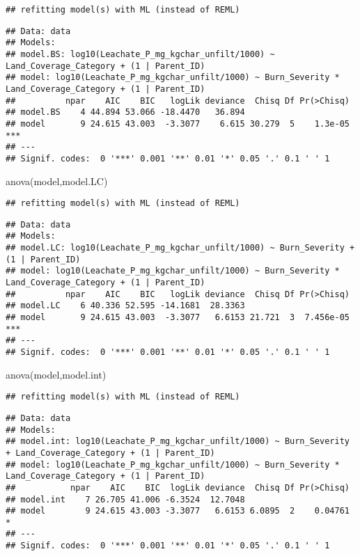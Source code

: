 \documentclass[
]{article}
\newenvironment{Shaded}{\begin{snugshade}}{\end{snugshade}}
\newcommand{\FunctionTok}[1]{\textcolor[rgb]{0.00,0.00,0.00}{#1}}
\newcommand{\NormalTok}[1]{#1}
\begin{document}
\begin{verbatim}
## refitting model(s) with ML (instead of REML)
\end{verbatim}

\begin{verbatim}
## Data: data
## Models:
## model.BS: log10(Leachate_P_mg_kgchar_unfilt/1000) ~ Land_Coverage_Category + (1 | Parent_ID)
## model: log10(Leachate_P_mg_kgchar_unfilt/1000) ~ Burn_Severity * Land_Coverage_Category + (1 | Parent_ID)
##          npar    AIC    BIC   logLik deviance  Chisq Df Pr(>Chisq)    
## model.BS    4 44.894 53.066 -18.4470   36.894                         
## model       9 24.615 43.003  -3.3077    6.615 30.279  5    1.3e-05 ***
## ---
## Signif. codes:  0 '***' 0.001 '**' 0.01 '*' 0.05 '.' 0.1 ' ' 1
\end{verbatim}

\begin{Shaded}
\begin{Highlighting}[]
\FunctionTok{anova}\NormalTok{(model,model.LC)}
\end{Highlighting}
\end{Shaded}

\begin{verbatim}
## refitting model(s) with ML (instead of REML)
\end{verbatim}

\begin{verbatim}
## Data: data
## Models:
## model.LC: log10(Leachate_P_mg_kgchar_unfilt/1000) ~ Burn_Severity + (1 | Parent_ID)
## model: log10(Leachate_P_mg_kgchar_unfilt/1000) ~ Burn_Severity * Land_Coverage_Category + (1 | Parent_ID)
##          npar    AIC    BIC   logLik deviance  Chisq Df Pr(>Chisq)    
## model.LC    6 40.336 52.595 -14.1681  28.3363                         
## model       9 24.615 43.003  -3.3077   6.6153 21.721  3  7.456e-05 ***
## ---
## Signif. codes:  0 '***' 0.001 '**' 0.01 '*' 0.05 '.' 0.1 ' ' 1
\end{verbatim}

\begin{Shaded}
\begin{Highlighting}[]
\FunctionTok{anova}\NormalTok{(model,model.int)}
\end{Highlighting}
\end{Shaded}

\begin{verbatim}
## refitting model(s) with ML (instead of REML)
\end{verbatim}

\begin{verbatim}
## Data: data
## Models:
## model.int: log10(Leachate_P_mg_kgchar_unfilt/1000) ~ Burn_Severity + Land_Coverage_Category + (1 | Parent_ID)
## model: log10(Leachate_P_mg_kgchar_unfilt/1000) ~ Burn_Severity * Land_Coverage_Category + (1 | Parent_ID)
##           npar    AIC    BIC  logLik deviance  Chisq Df Pr(>Chisq)  
## model.int    7 26.705 41.006 -6.3524  12.7048                       
## model        9 24.615 43.003 -3.3077   6.6153 6.0895  2    0.04761 *
## ---
## Signif. codes:  0 '***' 0.001 '**' 0.01 '*' 0.05 '.' 0.1 ' ' 1
\end{verbatim}
\end{document}
